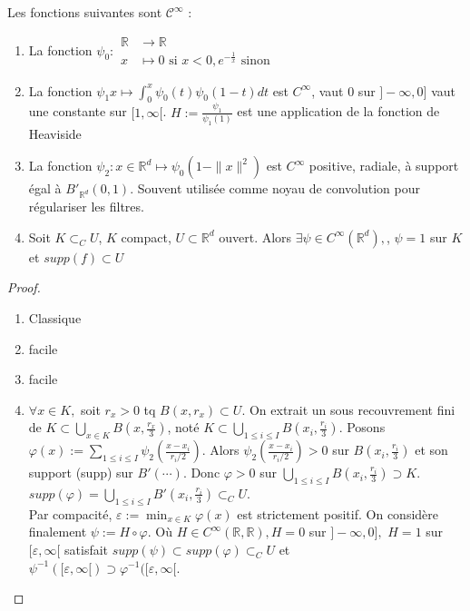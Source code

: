 \begin{lemme}

Les fonctions suivantes sont $\mathcal{C}^\infty$ :
\begin{enumerate}
        \item La fonction $\psi_0:
            \begin{aligned}
                \mathbb{R} &\to \mathbb{R} \\
                x&\mapsto 0 \text{ si } x<0, e^{-\frac{1}{x}} \text{ sinon}
            \end{aligned}$
        \item La fonction $\psi_1x\mapsto \int_0^x\psi_0(t)\psi_0(1-t)dt$ est $C^\infty $, vaut 0 sur $]-\infty ,0]$  vaut une constante sur $[1,\infty [$. $H:=\frac{\psi_1}{\psi_1(1)} $  est une application de la fonction de Heaviside
        \item La fonction $\psi_2:x\in \mathbb{R} ^d\mapsto \psi_0(1-\|x\|^2)$ est $C^\infty $  positive, radiale, à support égal à $B'_{\mathbb{R} ^d}(0,1)$. Souvent utilisée comme noyau de convolution pour régulariser les filtres.
        \item Soit $K\subset_CU$, $K$ compact, $U\subset \mathbb{R} ^d$ ouvert. Alors $\exists \psi\in C^\infty (\mathbb{R} ^d),$, $\psi=1$ sur $K$et $supp(f)\subset U$
    \end{enumerate}
\end{lemme}
\begin{proof}
    \begin{enumerate}
        \item Classique
        \item facile
        \item facile
        \item $\forall x\in K, $  soit $r_x>0$ tq $B(x,r_x)\subset U$. On extrait un sous recouvrement fini de $K\subset \bigcup\limits_{x\in K} B(x,\frac{r_x}{3})$, noté $K\subset \bigcup\limits_{1\le i\le I} B(x_i, \frac{r_i}{3})$. Posons $\varphi (x):=\sum\limits_{1\le i\le I}^{} \psi_2(\frac{x-x_i}{r_i /2})$. Alors $\psi_2(\frac{x-x_i}{r_i /2})>0$ sur $B(x_i,\frac{r_i}{3})$ et son support (supp) sur $B'(\cdots)$. Donc $\varphi >0$  sur $\bigcup\limits_{1\le i\le I} B(x_i,\frac{r_i}{3})\supset K$. $supp(\varphi )=\bigcup\limits_{1\le i\le I} B'(x_i,\frac{r_i}{3})\subset _CU$.\\
            Par compacité, $\varepsilon :=\min_{x\in K}\varphi (x)$  est strictement positif. On considère finalement $\psi:=H\circ \varphi $. Où $H\in C^\infty (\mathbb{R} ,\mathbb{R} ), H=0$ sur $]-\infty ,0],$ $H=1$ sur $[\varepsilon ,\infty [$ satisfait $supp(\psi)\subset supp(\varphi )\subset _CU$ et \\
            $\psi^{-1}([\varepsilon ,\infty [)\supset \varphi ^{-1} ([\varepsilon ,\infty [$.
    \end{enumerate}
\end{proof}

